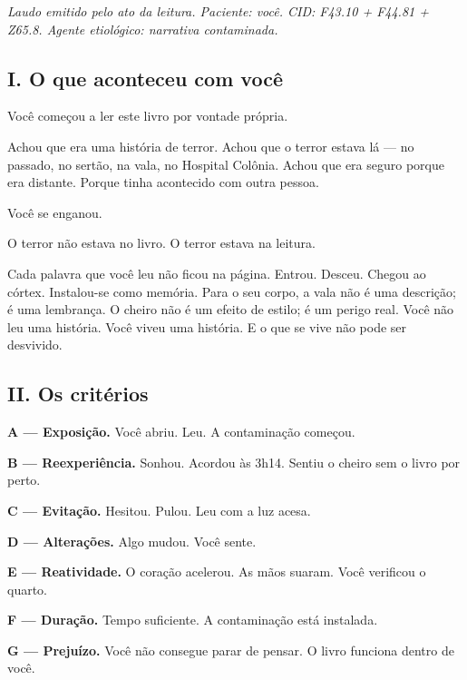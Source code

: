 
\noindent \textit{Laudo emitido pelo ato da leitura. Paciente: você. CID: F43.10 + F44.81 + Z65.8. Agente etiológico: narrativa contaminada.}

\subsection*{I. O que aconteceu com você}

\noindent Você começou a ler este livro por vontade própria.

\noindent Achou que era uma história de terror. Achou que o terror estava lá --- no passado, no sertão, na vala, no Hospital Colônia. Achou que era seguro porque era distante. Porque tinha acontecido com outra pessoa.

\noindent Você se enganou.

\noindent O terror não estava no livro. O terror estava na leitura.

\noindent Cada palavra que você leu não ficou na página. Entrou. Desceu. Chegou ao córtex. Instalou-se como memória. Para o seu corpo, a vala não é uma descrição; é uma lembrança. O cheiro não é um efeito de estilo; é um perigo real. Você não leu uma história. Você viveu uma história. E o que se vive não pode ser desvivido.

\subsection*{II. Os critérios}

\noindent \textbf{A --- Exposição.} Você abriu. Leu. A contaminação começou.

\noindent \textbf{B --- Reexperiência.} Sonhou. Acordou às 3h14. Sentiu o cheiro sem o livro por perto.

\noindent \textbf{C --- Evitação.} Hesitou. Pulou. Leu com a luz acesa.

\noindent \textbf{D --- Alterações.} Algo mudou. Você sente.

\noindent \textbf{E --- Reatividade.} O coração acelerou. As mãos suaram. Você verificou o quarto.

\noindent \textbf{F --- Duração.} Tempo suficiente. A contaminação está instalada.

\noindent \textbf{G --- Prejuízo.} Você não consegue parar de pensar. O livro funciona dentro de você.

